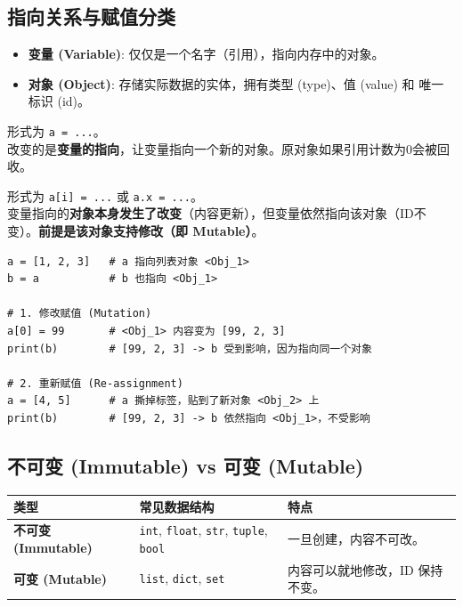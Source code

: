 \documentclass[12pt, a4paper]{article}
\begin{document}
\subsection{指向关系与赋值分类}

\begin{itemize}
    \item \textbf{变量 (Variable)}: 仅仅是一个名字（引用），指向内存中的对象。
    \item \textbf{对象 (Object)}: 存储实际数据的实体，拥有类型 (type)、值 (value) 和 唯一标识 (id)。
\end{itemize}

\begin{description}[style=multiline, leftmargin=3.5cm]
    \item[重新赋值 (Re-assignment)] 形式为 \texttt{a = ...}。
    \\ 改变的是\textbf{变量的指向}，让变量指向一个新的对象。原对象如果引用计数为0会被回收。
    
    \item[修改赋值 (Mutation)] 形式为 \texttt{a[i] = ...} 或 \texttt{a.x = ...}。
    \\ 变量指向的\textbf{对象本身发生了改变}（内容更新），但变量依然指向该对象（ID不变）。\textbf{前提是该对象支持修改（即 Mutable）}。
\end{description}

\begin{lstlisting}[caption={重新赋值 vs 修改赋值}]
a = [1, 2, 3]   # a 指向列表对象 <Obj_1>
b = a           # b 也指向 <Obj_1>

# 1. 修改赋值 (Mutation)
a[0] = 99       # <Obj_1> 内容变为 [99, 2, 3]
print(b)        # [99, 2, 3] -> b 受到影响，因为指向同一个对象

# 2. 重新赋值 (Re-assignment)
a = [4, 5]      # a 撕掉标签，贴到了新对象 <Obj_2> 上
print(b)        # [99, 2, 3] -> b 依然指向 <Obj_1>，不受影响
\end{lstlisting}

\subsection{不可变 (Immutable) vs 可变 (Mutable)}

\begin{table}[ht]
\centering
\begin{tabular}{l l l}
\toprule
\textbf{类型} & \textbf{常见数据结构} & \textbf{特点} \\
\midrule
\textbf{不可变 (Immutable)} & \texttt{int}, \texttt{float}, \texttt{str}, \texttt{tuple}, \texttt{bool} & 一旦创建，内容不可改。 \\
\midrule
\textbf{可变 (Mutable)} & \texttt{list}, \texttt{dict}, \texttt{set} & 内容可以就地修改，ID 保持不变。 \\
\bottomrule
\end{tabular}
\end{table}
\end{document}
